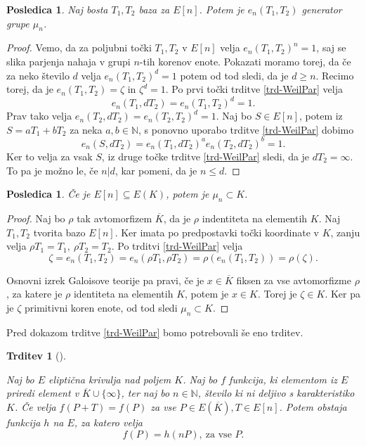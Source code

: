 \documentclass[12pt,a4paper,twoside]{article}
\theoremstyle{definition} %
\theoremstyle{plain} %
\newtheorem{trditev}[definicija]{Trditev}
\newtheorem{posledica}[definicija]{Posledica}
\numberwithin{equation}{section}  %
\newcommand{\N}{\mathbb N}
\newcommand{\E}[1]{E({#1})}
\begin{document}
\begin{posledica}
\label{PosledicaTrdParj}
Naj bosta $T_1,T_2$ baza za $E[n]$. Potem je $e_n(T_1,T_2)$ generator grupe $\mu_n$.
\end{posledica}


\begin{proof}
Vemo, da za poljubni točki $T_1,T_2$  v $E[n]$ velja $e_n(T_1,T_2)^n = 1$, saj se slika parjenja nahaja v grupi $n$-tih korenov enote. Pokazati moramo torej, da če za neko število $d$ velja  $e_n(T_1,T_2)^d = 1$ potem od tod sledi, da je $d \geq n$.
Recimo torej, da je $e_n(T_1,T_2) = \zeta$ in $\zeta^d = 1$.
Po prvi točki trditve \ref{trd-WeilPar} velja $$e_n(T_1,dT_2) = e_n(T_1,T_2)^d=1.$$ Prav tako velja $e_n(T_2,dT_2) = e_n(T_2,T_2)^d = 1 $. Naj bo $S \in E[n]$, potem iz $S = aT_1+bT_2$ za neka $a,b \in \N$, s ponovno uporabo trditve \ref{trd-WeilPar} dobimo
$$e_n(S,dT_2)= e_n(T_1,dT_2)^ae_n(T_2,dT_2)^b = 1. $$
Ker to velja za vsak $S$, iz druge točke trditve \ref{trd-WeilPar} sledi, da je $dT_2 = \infty$. To pa je možno le, če $n|d$, kar pomeni, da je $n \leq d$.
\end{proof}

\begin{posledica}
Če je $E[n] \subseteq \E{K}$, potem je $\mu_n \subset K$.

\end{posledica}

\begin{proof}
Naj bo $\rho$ tak avtomorfizem $\overline{K}$, da je $\rho$ indentiteta na elementih $K$. Naj $T_1,T_2$ tvorita bazo $E[n]$. Ker imata po predpostavki točki koordinate v $K$, zanju velja
$\rho T_1 = T_1, \ \rho T_2 = T_2$.
Po trditvi \ref{trd-WeilPar} velja
$$\zeta = e_n(T_1,T_2) = e_n(\rho T_1,\rho T_2) = \rho(e_n(T_1,T_2)) = \rho(\zeta).$$

Osnovni izrek Galoisove teorije \cite{milneFT} pa pravi, če je $x \in \overline{K}$ fiksen za vse avtomorfizme $\rho$, za katere je $\rho$ identiteta na elementih $K$, potem je $x\in K$. Torej je $\zeta \in K$. Ker pa je $\zeta$ primitivni koren enote, od tod sledi $\mu_n \subset K$.

\end{proof}

Pred dokazom trditve \ref{trd-WeilPar} bomo potrebovali še eno trditev.
\begin{trditev}[]
\label{trd:9.34}

Naj bo $E$ eliptična krivulja nad poljem $K$. Naj bo $f$ funkcija, ki elementom iz $E$ priredi element v $\overline{K} \cup \{ \infty \}$, ter naj bo $n \in \N$, število ki ni deljivo s karakteristiko $K$. Če velja $f(P+T) = f(P)$ za vse $P \in E(\overline{K}), T \in E[n]$. Potem obstaja funkcija $h$ na $E$, za katero velja
$$f(P) = h(nP), \ \text{za vse } P.$$

\end{trditev}
\end{document}
